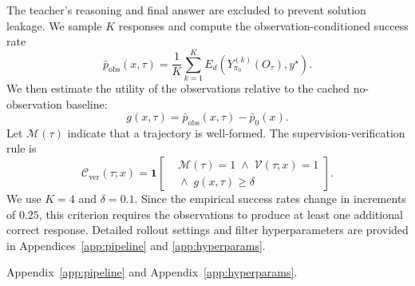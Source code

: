 The teacher's reasoning and final answer are excluded to prevent solution leakage. 
We sample $K$ responses and compute the observation-conditioned success rate
\begin{equation}
\bar{p}_{\mathrm{obs}}(x,\tau)
=
\frac{1}{K}
\sum_{k=1}^{K}
E_d\left(
Y_{\pi_0}^{(k)}(O_\tau),y^\star
\right).
\label{eq:observation-success-rate}
\end{equation}
We then estimate the utility of the observations relative to
the cached no-observation baseline:
\begin{equation}
g(x,\tau)
=
\bar{p}_{\mathrm{obs}}(x,\tau)-\bar{p}_0(x).
\label{eq:observation-gain}
\end{equation}
Let $\mathcal{M}(\tau)$ indicate that a trajectory is
well-formed. The supervision-verification rule is
\begin{equation}
\mathcal{C}_{\mathrm{ver}}(\tau;x)
=
\mathbf{1}
\left[
\begin{aligned}
&\mathcal{M}(\tau)=1
\;\land\;
\mathcal{V}(\tau;x)=1 \\
&{}\land\;
g(x,\tau)\geq\delta
\end{aligned}
\right].
\label{eq:supervision-verification}
\end{equation}
We use $K=4$ and $\delta=0.1$. Since the empirical success
rates change in increments of $0.25$, this criterion requires
the observations to produce at least one additional correct
response.
Detailed rollout settings and filter hyperparameters are provided in Appendices~\ref{app:pipeline} and \ref{app:hyperparams}.



Appendix~\ref{app:pipeline} and Appendix~\ref{app:hyperparams}.
